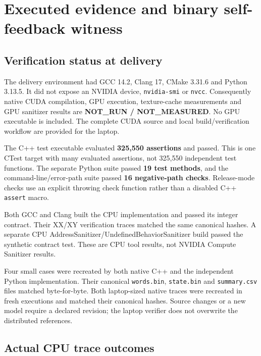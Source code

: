 \documentclass[11pt,a4paper]{article}
\begin{document}
\clearpage

\section{Executed evidence and binary self-feedback witness}\label{executed-evidence-and-binary-self-feedback-witness}

\subsection{Verification status at delivery}\label{verification-status-at-delivery}

The delivery environment had GCC 14.2, Clang 17, CMake 3.31.6 and Python 3.13.5. It did not expose an NVIDIA device, \texttt{nvidia-smi} or \texttt{nvcc}. Consequently native CUDA compilation, GPU execution, texture-cache measurements and GPU sanitizer results are \textbf{NOT\_RUN / NOT\_MEASURED}. No GPU executable is included. The complete CUDA source and local build/verification workflow are provided for the laptop.

The C++ test executable evaluated \textbf{325,550 assertions} and passed. This is one CTest target with many evaluated assertions, not 325,550 independent test functions. The separate Python suite passed \textbf{19 test methods}, and the command-line/error-path suite passed \textbf{16 negative-path checks}. Release-mode checks use an explicit throwing check function rather than a disabled C++ \texttt{assert} macro.

Both GCC and Clang built the CPU implementation and passed its integer contract. Their XX/XY verification traces matched the same canonical hashes. A separate CPU AddressSanitizer/UndefinedBehaviorSanitizer build passed the synthetic contract test. These are CPU tool results, not NVIDIA Compute Sanitizer results.

Four small cases were recreated by both native C++ and the independent Python implementation. Their canonical \texttt{words.bin}, \texttt{state.bin} and \texttt{summary.csv} files matched byte-for-byte. Both laptop-sized native traces were recreated in fresh executions and matched their canonical hashes. Source changes or a new model require a declared revision; the laptop verifier does not overwrite the distributed references.

\subsection{Actual CPU trace outcomes}\label{actual-cpu-trace-outcomes}
\end{document}
